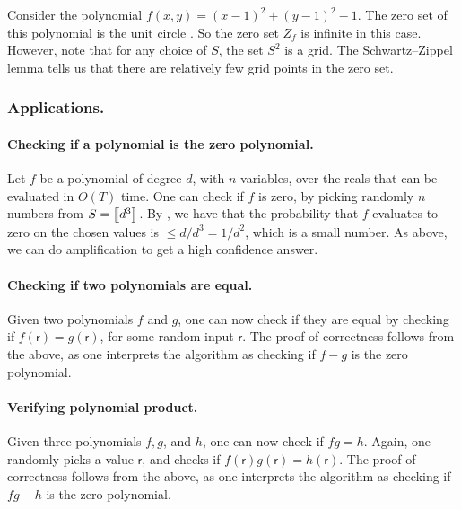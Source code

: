 \begin{remark}
    Consider the polynomial $f(x,y) = (x-1)^2 + (y-1)^2 - 1$. The zero
    set of this polynomial is the unit circle .
    So the zero set $Z_f$ is infinite in this case. However, note that for
    any choice of $S$, the set $S^2$ is a grid. The Schwartz--Zippel
    lemma tells us that there are relatively few grid points in the zero set.
\end{remark}

\subsubsection{Applications.}
\paragraph{Checking if a polynomial is the zero polynomial.}

Let $f$ be a polynomial of degree $d$, with $n$ variables, over the
reals that can be evaluated in $O(T)$ time. One can check if $f$ is zero,
by picking randomly $n$ numbers from $S= \left\llbracket d^3 \right\rrbracket$. By
, we have that the probability that $f$ evaluates to zero on
the chosen values is $\leq d/d^3 = 1/d^2$, which is a small
number. As above, we can do amplification to get a high confidence
answer.

\paragraph{Checking if two polynomials are equal.}

Given two polynomials $f$ and $g$, one can now check if they are equal
by checking if $f(\mathsf{r})=g(\mathsf{r})$, for some random input $\mathsf{r}$. The proof of
correctness follows from the above, as one interprets the algorithm as
checking if $f-g$ is the zero polynomial.

\paragraph{Verifying polynomial product.}

Given three polynomials $f,g$, and $h$, one can now check if
$f g = h$. Again, one randomly picks a value $\mathsf{r}$, and checks if
$f(\mathsf{r})g(\mathsf{r})=h(\mathsf{r})$. The proof of correctness follows from the above, as
one interprets the algorithm as checking if $fg - h$ is the zero
polynomial.

